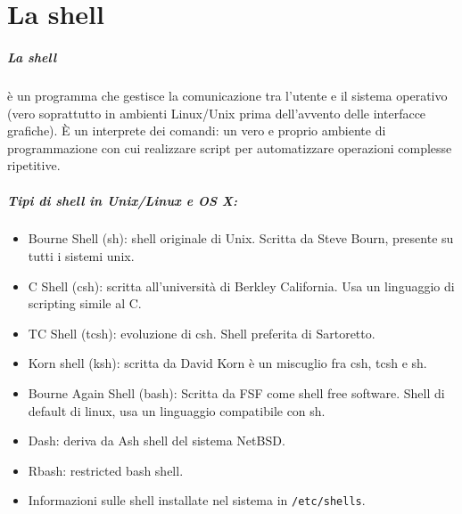 \documentclass[a4paper]{report}
\begin{document}
\chapter{La shell}
\paragraph{La shell} è un programma che gestisce la comunicazione tra l'utente e il sistema operativo (vero soprattutto in ambienti Linux/Unix prima dell'avvento delle interfacce grafiche). È un
interprete dei comandi: un vero e proprio
ambiente di programmazione con cui
realizzare script per automatizzare operazioni
complesse ripetitive.\\
\paragraph{Tipi di shell in Unix/Linux e OS X:}
\begin{itemize}
\item Bourne Shell (sh): shell originale di Unix. Scritta da Steve Bourn,
presente su tutti i sistemi unix.
\item C Shell (csh): scritta all’università di Berkley California. Usa un
linguaggio di scripting simile al C.
\item TC Shell (tcsh): evoluzione di csh. Shell preferita di Sartoretto.
\item Korn shell (ksh): scritta da David Korn è un miscuglio fra csh, tcsh e sh.
\item Bourne Again Shell (bash): Scritta da FSF come shell free software.
Shell di default di linux, usa un linguaggio compatibile con sh.
\item Dash: deriva da Ash shell del sistema NetBSD.
\item Rbash: restricted bash shell.
\item Informazioni sulle shell installate nel sistema in \texttt{/etc/shells}.
\end{itemize}
\end{document}
